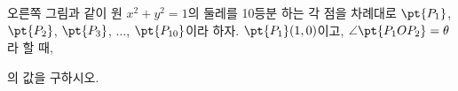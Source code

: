 \noindent\begin{minipage}[t]{0.58\linewidth}\vspace{0pt}\raggedright 오른쪽 그림과 같이 원 $x^2+y^2=1$의 둘레를 10등분 하는 각 점을 차례대로 $\pt{P_1}$, $\pt{P_2}$, $\pt{P_3}$, $\ldots$, $\pt{P_{10}}$이라 하자. $\pt{P_1}(1{,}\mkern3mu\mathopen{}0)$이고, $\angle\pt{P_1OP_2}=\theta$라 할 때,\par\smallskip\end{minipage}\hfill\begin{minipage}[t]{0.4\linewidth}\vspace{0pt}\centering \resizebox{\ifdim\width>\linewidth\linewidth\else\width\fi}{!}{}\end{minipage}\par
\noindent \dispeq{$\cos\theta+\cos 2\theta+\cos 3\theta+\cdots+\cos 9\theta+\cos 10\theta$}\par\smallskip\noindent 의 값을 구하시오. 
